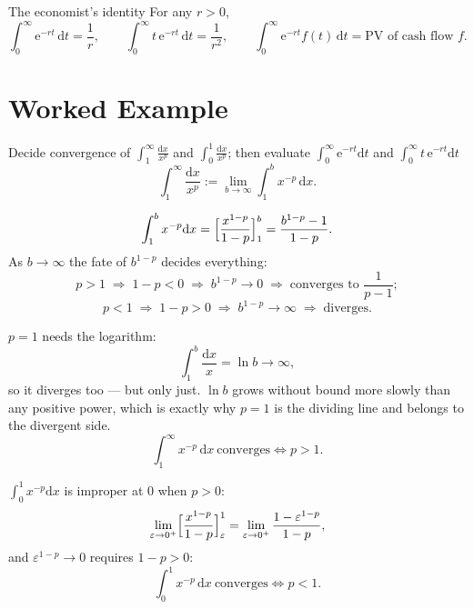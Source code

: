\begin{rulebox}{The economist's identity}
For any $r>0$,
\[
  \int_{0}^{\infty} \mathrm{e}^{-rt}\,\mathrm{d}t=\frac{1}{r},\qquad
  \int_{0}^{\infty} t\,\mathrm{e}^{-rt}\,\mathrm{d}t=\frac{1}{r^{2}},\qquad
  \int_{0}^{\infty} \mathrm{e}^{-rt}f(t)\,\mathrm{d}t=\text{PV of cash flow }f .
\]
\end{rulebox}

\section{Worked Example}

\begin{worked}{Decide convergence of $\displaystyle\int_{1}^{\infty}\frac{\mathrm{d}x}{x^{p}}$ and $\displaystyle\int_{0}^{1}\frac{\mathrm{d}x}{x^{p}}$; then evaluate $\displaystyle\int_{0}^{\infty}\mathrm{e}^{-rt}\mathrm{d}t$ and $\displaystyle\int_{0}^{\infty}t\,\mathrm{e}^{-rt}\mathrm{d}t$}
\[
  \int_{1}^{\infty}\frac{\mathrm{d}x}{x^{p}}
  :=\lim_{b\to\infty}\int_{1}^{b}x^{-p}\,\mathrm{d}x .
\]

\[
  \int_{1}^{b}x^{-p}\mathrm{d}x=\Bigl[\frac{x^{1-p}}{1-p}\Bigr]_{1}^{b}
  =\frac{b^{1-p}-1}{1-p} .
\]
As $b\to\infty$ the fate of $b^{1-p}$ decides everything:
\[
  p>1\;\Rightarrow\;1-p<0\;\Rightarrow\;b^{1-p}\to0
  \;\Rightarrow\;\text{converges to }\frac{1}{p-1};
\]
\[
  p<1\;\Rightarrow\;1-p>0\;\Rightarrow\;b^{1-p}\to\infty
  \;\Rightarrow\;\text{diverges.}
\]

$p=1$ needs the logarithm:
\[
  \int_{1}^{b}\frac{\mathrm{d}x}{x}=\ln b\to\infty ,
\]
so it diverges too --- but only just. $\ln b$ grows without bound more
slowly than any positive power, which is exactly why $p=1$ is the dividing
line and belongs to the divergent side.
\[
  \boxed{\int_{1}^{\infty}x^{-p}\,\mathrm{d}x\ \text{converges}\iff p>1 .}
\]

$\int_{0}^{1}x^{-p}\mathrm{d}x$ is improper at $0$ when $p>0$:
\[
  \lim_{\varepsilon\to0^{+}}\Bigl[\frac{x^{1-p}}{1-p}\Bigr]_{\varepsilon}^{1}
  =\lim_{\varepsilon\to0^{+}}\frac{1-\varepsilon^{1-p}}{1-p} ,
\]
and $\varepsilon^{1-p}\to0$ requires $1-p>0$:
\[
  \boxed{\int_{0}^{1}x^{-p}\,\mathrm{d}x\ \text{converges}\iff p<1 .}
\]


\end{worked}
